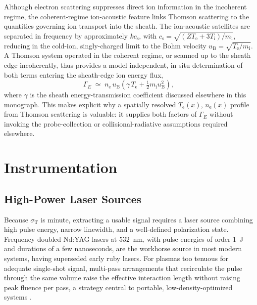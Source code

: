 Although electron scattering suppresses direct ion information in the incoherent regime, the coherent-regime ion-acoustic feature links Thomson scattering to the quantities governing ion transport into the sheath. The ion-acoustic satellites are separated in frequency by approximately $k c_{\mathrm{s}}$, with $c_{\mathrm{s}} = \sqrt{(Z T_{\mathrm{e}} + 3T_{\mathrm{i}})/m_{\mathrm{i}}}$, reducing in the cold-ion, singly-charged limit to the Bohm velocity $u_{\mathrm{B}} = \sqrt{T_{\mathrm{e}}/m_{\mathrm{i}}}$. A Thomson system operated in the coherent regime, or scanned up to the sheath edge incoherently, thus provides a model-independent, in-situ determination of both terms entering the sheath-edge ion energy flux,
\begin{equation}
\Gamma_{E} \;\simeq\; n_{\mathrm{e}}\, u_{\mathrm{B}} \left(\gamma\, T_{\mathrm{e}} + \tfrac{1}{2} m_{\mathrm{i}} u_{\mathrm{B}}^{2}\right),
\label{eq:gamma-e-schematic}
\end{equation}
where $\gamma$ is the sheath energy-transmission coefficient discussed elsewhere in this monograph. This makes explicit why a spatially resolved $T_{\mathrm{e}}(x)$, $n_{\mathrm{e}}(x)$ profile from Thomson scattering is valuable: it supplies both factors of $\Gamma_{E}$ without invoking the probe-collection or collisional-radiative assumptions required elsewhere.

\section{Instrumentation}

\subsection{High-Power Laser Sources}

Because $\sigma_{\mathrm{T}}$ is minute, extracting a usable signal requires a laser source combining high pulse energy, narrow linewidth, and a well-defined polarization state. Frequency-doubled Nd:YAG lasers at \SI{532}{\nano\meter}, with pulse energies of order \SI{1}{\joule} and durations of a few nanoseconds, are the workhorse source in most modern systems, having superseded early ruby lasers. For plasmas too tenuous for adequate single-shot signal, multi-pass arrangements that recirculate the pulse through the same volume raise the effective interaction length without raising peak fluence per pass, a strategy central to portable, low-density-optimized systems \cite{ref0357}.

